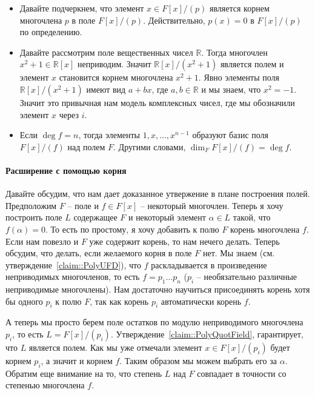 \begin{remarks}
\begin{itemize}
\item Давайте подчеркнем, что элемент $x\in F[x]/(p)$ является корнем многочлена $p$ в поле $F[x]/(p)$.
Действительно, $p(x) = 0$ в $F[x]/(p)$ по определению.

\item Давайте рассмотрим поле вещественных чисел $\mathbb R$.
Тогда многочлен $x^2 + 1\in \mathbb R[x]$ неприводим.
Значит $\mathbb R[x]/(x^2 +1)$ является полем и элемент $x$ становится корнем многочлена $x^2 + 1$.
Явно элементы поля $\mathbb R[x]/(x^2 + 1)$ имеют вид $a + bx$, где $a, b\in \mathbb R$ и мы знаем, что $x^2 = -1$.
Значит это привычная нам модель комплексных чисел, где мы обозначили элемент $x$ через $i$.

\item Если $\deg f = n$, тогда элементы $1, x, \ldots, x^{n-1}$ образуют базис поля $F[x]/(f)$ над полем $F$.
Другими словами, $\dim_F F[x]/(f) = \deg f$.
\end{itemize}
\end{remarks}

\paragraph{Расширение с помощью корня}

Давайте обсудим, что нам дает доказанное утвержение в плане построения полей.
Предположим $F$ -- поле и $f\in F[x]$ -- некоторый многочлен.
Теперь я хочу построить поле $L$ содержащее $F$ и некоторый элемент $\alpha \in L$ такой, что $f(\alpha) = 0$.
То есть по простому, я хочу добавить к полю $F$ корень многочлена $f$.
Если нам повезло и $F$ уже содержит корень, то нам нечего делать.
Теперь обсудим, что делать, если желаемого корня в поле $F$ нет.
Мы знаем (см. утверждение~\ref{claim::PolyUFD}), что $f$ раскладывается в произведение неприводимых многочленов, то есть $f = p_1\ldots p_n$ ($p_i$ -- необязательно различные неприводимые многочлены).
Нам достаточно научиться присоединять корень хотя бы одного $p_i$ к полю $F$, так как корень $p_i$ автоматически корень $f$.

А теперь мы просто берем поле остатков по модулю неприводимого многочлена $p_i$, то есть $L = F[x]/(p_i)$.
Утверждение~\ref{claim::PolyQuotField}, гарантирует, что $L$ является полем.
Как мы уже отмечали элемент $x\in F[x]/(p_i)$ будет корнем $p_i$, а значит и корнем $f$.
Таким образом мы можем выбрать его за $\alpha$.
Обратим еще внимание на то, что степень $L$ над $F$ совпадает в точности со степенью многочлена $f$.


